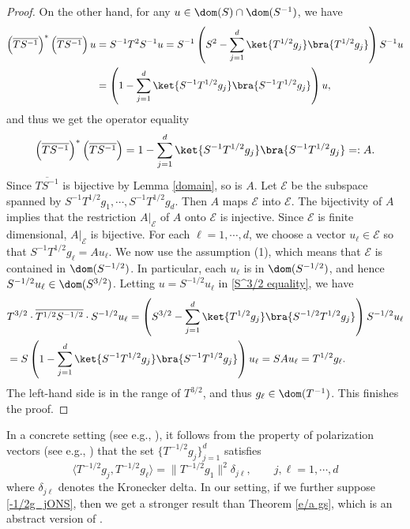 \documentclass[12pt]{article}
\theoremstyle{plain}
\numberwithin{equation}{section}
\theoremstyle{remark}
\begin{document}
\begin{proof}
On the other hand, for any $u\in\dom(S)\cap\dom(S^{-1})$, we have
\begin{align*}
\left(\overline{TS^{-1}}\right)^*\left(\overline{TS^{-1}}\right)u 
&= S^{-1}T^2S^{-1}u = S^{-1}\left(S^{2}-\sum_{j=1}^d\ket{T^{1/2}g_j}\bra{T^{1/2}g_j}\right)S^{-1}u\\
&= \left(1-\sum_{j=1}^d\ket{S^{-1}T^{1/2}g_j}\bra{S^{-1}T^{1/2}g_j}\right)u,
\end{align*}
and thus we get the operator equality
\begin{equation*}
\left(\overline{TS^{-1}}\right)^*\left(\overline{TS^{-1}}\right) = 1-\sum_{j=1}^d\ket{S^{-1}T^{1/2}g_j}\bra{S^{-1}T^{1/2}g_j}=:A.
\end{equation*}
Since $\overline{TS^{-1}}$ is bijective by Lemma \ref{domain}, so is $A$.
Let $\mathscr{E}$ be the subspace spanned by $S^{-1}T^{1/2}g_1,\cdots,S^{-1}T^{1/2}g_d$.
Then $A$ maps $\mathscr{E}$ into $\mathscr{E}$.
The bijectivity of $A$ implies that the restriction $A|_{\mathscr{E}}$ of $A$ onto $\mathscr{E}$ is injective.
Since $\mathscr{E}$ is finite dimensional, $A|_{\mathscr{E}}$ is bijective.
For each $\ell=1,\cdots,d$, we choose a vector $u_\ell\in\mathscr{E}$ so that $S^{-1}T^{1/2}g_\ell=Au_\ell$.
We now use the assumption (1), which means that $\mathscr{E}$ is contained in $\dom(S^{-1/2})$. 
In particular, each $u_\ell$ is in $\dom(S^{-1/2})$, and hence $S^{-1/2}u_\ell\in\dom(S^{3/2})$.
Letting $u=S^{-1/2}u_\ell$ in \eqref{S^3/2 equality}, we have
\begin{align*}
&T^{3/2}\cdot\overline{T^{1/2}S^{-1/2}}\cdot S^{-1/2}u_\ell
= \left(S^{3/2}-\sum_{j=1}^d\ket{T^{1/2}g_j}\bra{S^{-1/2}T^{1/2}g_j}\right)S^{-1/2}u_\ell\\
&=S\left(1-\sum_{j=1}^d\ket{S^{-1}T^{1/2}g_j}\bra{S^{-1}T^{1/2}g_j}\right)u_\ell
=SAu_\ell =T^{1/2}g_\ell.
\end{align*}
The left-hand side is in the range of $T^{3/2}$, and thus $g_\ell\in\dom(T^{-1})$.
This finishes the proof.
\end{proof}


In a concrete setting (see e.g., \cite{A83b}), it follows from the property of polarization vectors (see e.g., \cite[equality (11.26)]{A18}) 
that the set $\{T^{-1/2}g_j\}_{j=1}^d$ satisfies
\begin{equation}\label{-1/2g_jONS}
\langle T^{-1/2}g_j,T^{-1/2}g_\ell\rangle =\|T^{-1/2}g_1\|^2\delta_{j\ell},\qquad j,\ell=1,\cdots,d
\end{equation}
where $\delta_{j\ell}$ denotes the Kronecker delta.
In our setting, if we further suppose \eqref{-1/2g_jONS}, then we get a stronger result than Theorem \ref{e/a gs}, which is an abstract version of \cite[Theorem 3.3]{A83b}.
\end{document}
